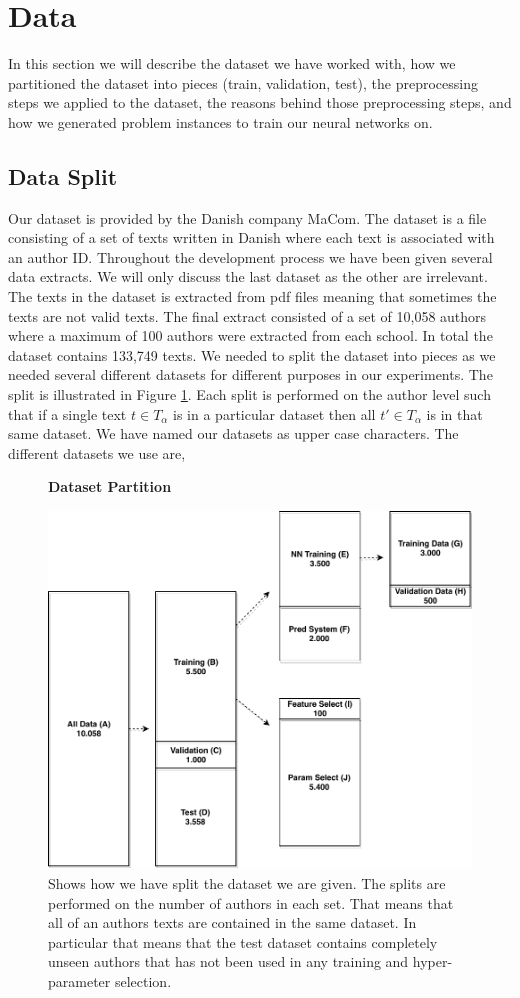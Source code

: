 \section{Data} \label{sec:data}

In this section we will describe the dataset we have worked with, how we
partitioned the dataset into pieces (train, validation, test), the preprocessing
steps we applied to the dataset, the reasons behind those preprocessing steps,
and how we generated problem instances to train our neural networks on.


\subsection{Data Split}

Our dataset is provided by the Danish company MaCom. The dataset is a file
consisting of a set of texts written in Danish where each text is associated
with an author ID. Throughout the development process we have been given
several data extracts. We will only discuss the last dataset as the other are
irrelevant. The texts in the dataset is extracted from pdf files meaning that
sometimes the texts are not valid texts. The final extract consisted of a set of
10,058 authors where a maximum of 100 authors were extracted from each school.
In total the dataset contains 133,749 texts. We needed to split the dataset into
pieces as we needed several different datasets for different purposes in our
experiments. The split is illustrated in Figure \ref{fig:data_split}. Each split
is performed on the author level such that if a single text $t \in T_\alpha$ is
in a particular dataset then all $t' \in T_\alpha$ is in that same dataset. We
have named our datasets as upper case characters. The different datasets we use
are,

\begin{figure}
    \centering
    \textbf{Dataset Partition}\par\medskip
    \includegraphics[width=.6\textwidth]{./pictures/data/data_split}
    \caption{Shows how we have split the dataset we are given. The splits are
        performed on the number of authors in each set. That means that all of
        an authors texts are contained in the same dataset. In particular that
        means that the test dataset contains completely unseen authors that has
        not been used in any training and hyper-parameter selection.}
    \label{fig:data_split}
\end{figure}

